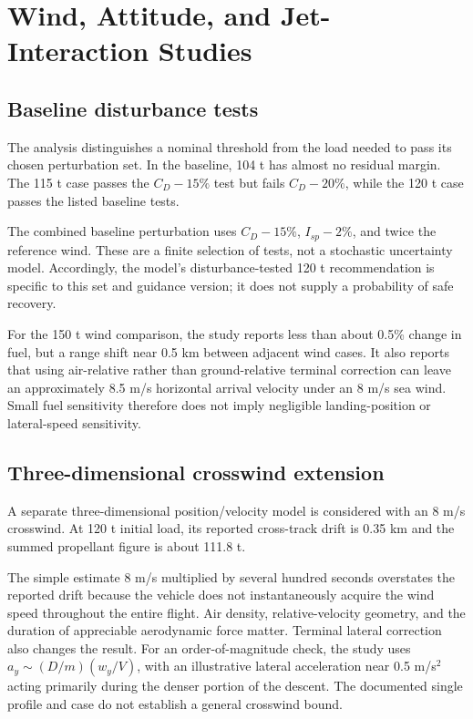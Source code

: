\documentclass[11pt,a4paper]{article}
\begin{document}
\section{Wind, Attitude, and Jet-Interaction Studies}
\subsection{Baseline disturbance tests}
The analysis distinguishes a nominal threshold from the load needed to pass its chosen perturbation set. In the baseline, 104 t has almost no residual margin. The 115 t case passes the $C_D-15\%$ test but fails $C_D-20\%$, while the 120 t case passes the listed baseline tests.



The combined baseline perturbation uses $C_D-15\%$, $I_{sp}-2\%$, and twice the reference wind. These are a finite selection of tests, not a stochastic uncertainty model. Accordingly, the model's disturbance-tested 120 t recommendation is specific to this set and guidance version; it does not supply a probability of safe recovery.



For the 150 t wind comparison, the study reports less than about 0.5\% change in fuel, but a range shift near 0.5 km between adjacent wind cases. It also reports that using air-relative rather than ground-relative terminal correction can leave an approximately 8.5 m/s horizontal arrival velocity under an 8 m/s sea wind. Small fuel sensitivity therefore does not imply negligible landing-position or lateral-speed sensitivity.

\subsection{Three-dimensional crosswind extension}
A separate three-dimensional position/velocity model is considered with an 8 m/s crosswind. At 120 t initial load, its reported cross-track drift is 0.35 km and the summed propellant figure is about 111.8 t.



The simple estimate $8$ m/s multiplied by several hundred seconds overstates the reported drift because the vehicle does not instantaneously acquire the wind speed throughout the entire flight. Air density, relative-velocity geometry, and the duration of appreciable aerodynamic force matter. Terminal lateral correction also changes the result. For an order-of-magnitude check, the study uses $a_y\sim(D/m)(w_y/V)$, with an illustrative lateral acceleration near 0.5 m/s$^2$ acting primarily during the denser portion of the descent. The documented single profile and case do not establish a general crosswind bound.
\end{document}
